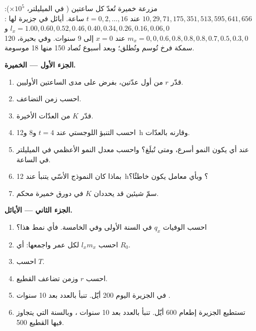 \begin{problem}
\label{pb:b1:populations:1}
مزرعة خميرة تُعدّ كل ساعتين ( في الميليلتر،
$\times 10^5$): $10, 29, 71, 175, 351, 513, 595, 641, 656$ عند $t = 0,
2, \ldots, 16$ ساعة.  أيائل في جزيرة لها :
$l_x = 1.00, 0.60, 0.52, 0.46, 0.40, 0.34, 0.26, 0.16, 0.06, 0$ و
$m_x = 0, 0, 0.6, 0.8, 0.8, 0.8, 0.7, 0.5, 0.3, 0$ عند $x = 0$ إلى $9$
سنوات. وفي بحيرة، 120 سمكة فرخ تُوسم وتُطلق؛ وبعد أسبوع تُصاد 150
منها 18 موسومة.

\medskip
\noindent\textbf{الجزء الأول --- الخميرة.}
\begin{enumerate}
  \item قدّر $r$ من أول عدّتين، بفرض  على مدى الساعتين
        الأوليين.
  \item احسب زمن التضاعف.
  \item قدّر $K$ من العدّات الأخيرة.
  \item احسب التنبؤ اللوجستي عند $t = 4$ و$8$ و\qty{12}{h}
        وقارنه بالعدّات.
  \item عند أي  يكون النمو أسرع، ومتى تُبلَغ؟ واحسب معدل
        النمو الأعظمي  في الميليلتر في الساعة.
  \item بماذا كان النموذج الأسّي يتنبأ عند \qty{12}{h}؟ وبأي معامل
        يكون خاطئًا؟
  \item سمّ شيئين قد يحددان $K$ في دورق خميرة محكم.
\end{enumerate}

\medskip
\noindent\textbf{الجزء الثاني --- الأيائل.}
\begin{enumerate}[resume]
  \item احسب الوفيات $q_x$ في السنة الأولى وفي الخامسة. فأي نمط
         هذا؟
  \item احسب $l_x m_x$ لكل عمر واجمعها: أي $R_0$.
  \item احسب $T$.
  \item احسب $r$ وزمن تضاعف القطيع.
  \item في الجزيرة اليوم 200 أيّل. تنبأ بالعدد بعد 10
        سنوات .
  \item تستطيع الجزيرة إطعام 600 أيّل. تنبأ بالعدد بعد 10 سنوات
        ، وبالسنة التي يتجاوز فيها القطيع 500.
\end{enumerate}


\end{problem}
